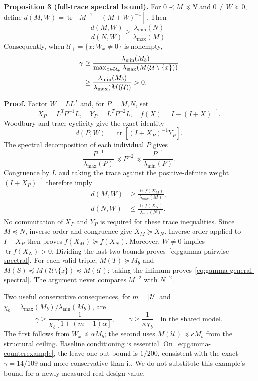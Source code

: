 \textbf{Proposition 3 (full-trace spectral bound).} For $0\prec M\preceq N$ and $0\ne W\succeq0$, define $d(M,W)=\operatorname{tr}[M^{-1}-(M+W)^{-1}]$. Then
\begin{equation}
\frac{d(M,W)}{d(N,W)}\geq\frac{\lambda_{\min}(N)}{\lambda_{\max}(M)}.
\label{eq:gamma-pairwise-spectral}
\end{equation}
Consequently, when $\mathcal U_+=\{x:W_x\ne0\}$ is nonempty,
\begin{align}
\gamma&\geq
\frac{\lambda_{\min}(M_b)}{\max_{x\in\mathcal U_+}\lambda_{\max}(M(\mathcal U\setminus\{x\}))}
\notag\\
&\geq\frac{\lambda_{\min}(M_b)}{\lambda_{\max}(M(\mathcal U))}>0.
\label{eq:gamma-general-spectral}
\end{align}

\textbf{Proof.} Factor $W=LL^T$ and, for $P=M,N$, set
\begin{equation}
X_P=L^TP^{-1}L,\quad Y_P=L^TP^{-2}L,\quad
f(X)=I-(I+X)^{-1}.
\end{equation}
Woodbury and trace cyclicity give the exact identity
\begin{equation}
d(P,W)=\operatorname{tr}[(I+X_P)^{-1}Y_P].
\end{equation}
The spectral decomposition of each individual $P$ gives
\begin{equation}
\frac{P^{-1}}{\lambda_{\max}(P)}\preceq P^{-2}
\preceq\frac{P^{-1}}{\lambda_{\min}(P)}.
\end{equation}
Congruence by $L$ and taking the trace against the positive-definite weight $(I+X_P)^{-1}$ therefore imply
\begin{align}
d(M,W)&\geq\frac{\operatorname{tr}f(X_M)}{\lambda_{\max}(M)},\\
d(N,W)&\leq\frac{\operatorname{tr}f(X_N)}{\lambda_{\min}(N)}.
\end{align}
No commutation of $X_P$ and $Y_P$ is required for these trace inequalities. Since $M\preceq N$, inverse order and congruence give $X_M\succeq X_N$. Inverse order applied to $I+X_P$ then proves $f(X_M)\succeq f(X_N)$. Moreover, $W\ne0$ implies $\operatorname{tr}f(X_N)>0$. Dividing the last two bounds proves~\eqref{eq:gamma-pairwise-spectral}. For each valid triple, $M(T)\succeq M_b$ and $M(S)\preceq M(\mathcal U\setminus\{x\})\preceq M(\mathcal U)$; taking the infimum proves~\eqref{eq:gamma-general-spectral}. The argument never compares $M^{-2}$ with $N^{-2}$.

Two useful conservative consequences, for $m=|\mathcal U|$ and $\chi_b=\lambda_{\max}(M_b)/\lambda_{\min}(M_b)$, are
\begin{equation}
\gamma\geq\frac1{\chi_b[1+(m-1)\alpha]},\qquad
\gamma\geq\frac1{\kappa\chi_b}\quad\text{in the shared model}.
\end{equation}
The first follows from $W_x\preceq\alpha M_b$; the second uses $M(\mathcal U)\preceq\kappa M_b$ from the structural ceiling. Baseline conditioning is essential. On~\eqref{eq:gamma-counterexample}, the leave-one-out bound is $1/200$, consistent with the exact $\gamma=14/109$ and more conservative than it. We do not substitute this example's bound for a newly measured real-design value.

